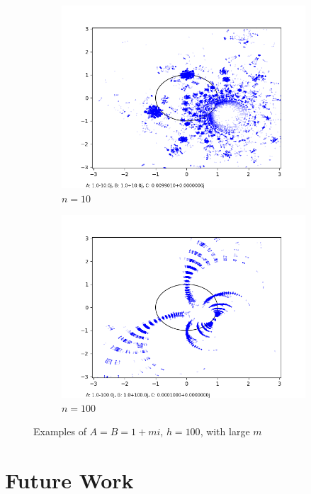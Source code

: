 \documentclass[12pt,a4paper,reqno,parskip=full]{amsart}
\numberwithin{equation}{section}
\theoremstyle{plain}
\theoremstyle{definition}
\begin{document}
\begin{figure}[H]
\begin{subfigure}[b]{0.3\textwidth}
         \includegraphics[width=\textwidth]{images/nn/a-10 b10 h30 d0.01.png}
         \caption{$n=10$}
         \label{fig:n10}
    \end{subfigure}
     \begin{subfigure}[b]{0.3\textwidth}
         \centering
         \includegraphics[width=\textwidth]{images/nn/a-100 b100 h40 d0.025.png}
         \caption{$n=100$}
         \label{fig:n100}
    \end{subfigure}
    \caption{Examples of $A=B=1+mi$, $h=100$, with large $m$}
    \label{fig:nn}
\end{figure}


\section{Future Work}
\end{document}
